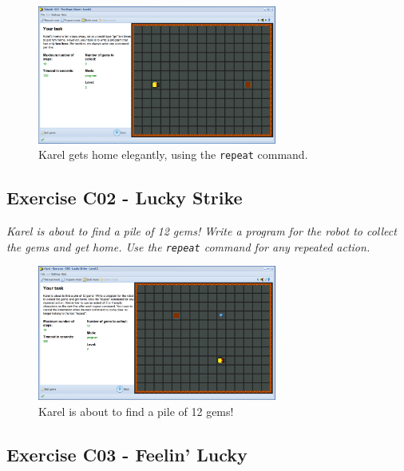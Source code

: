 \documentclass[article,A4,12pt]{llncs}
\begin{document}
{{{\begin{figure}[!ht]
\begin{center}
\includegraphics[width=0.7\textwidth]{img/c01.png}
\end{center}
\vspace{-4mm}
\caption{Karel gets home elegantly, using the {\tt repeat} command.}
\label{fig:c01}
\vspace{-4mm}
\end{figure}
\noindent


\subsection{Exercise C02 - Lucky Strike}

{\em Karel is about to find a pile of 12 gems! Write a program for the robot to collect the gems and get home. Use the {\tt repeat} command for any repeated action. 

\begin{figure}[!ht]
\begin{center}
\includegraphics[width=0.7\textwidth]{img/c02.png}
\end{center}
\vspace{-4mm}
\caption{Karel is about to find a pile of 12 gems!}
\label{fig:c02}
\vspace{-4mm}
\end{figure}
\noindent

\newpage

\subsection{Exercise C03 - Feelin' Lucky}

}}}}
\end{document}
